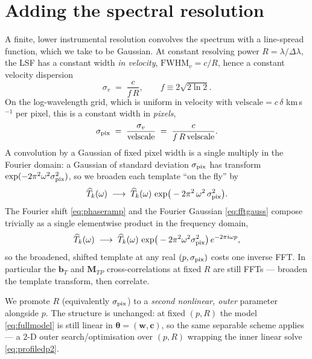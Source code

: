 \documentclass[11pt]{article}
\newcommand{\velscale}{\mathrm{velscale}}
\begin{document}
\section{Adding the spectral resolution}
\label{sec:resolution}
A finite, lower instrumental resolution convolves the spectrum with a
line-spread function, which we take to be Gaussian. At constant resolving power
$R=\lambda/\Delta\lambda$, the LSF has a constant width \emph{in velocity},
$\mathrm{FWHM}_v = c/R$, hence a constant velocity dispersion
\begin{equation}
  \sigma_v \;=\; \frac{c}{f\,R},
  \qquad f \equiv 2\sqrt{2\ln 2}.
\end{equation}
On the log-wavelength grid, which is uniform in velocity with
$\velscale = c\,\delta$ km\,s$^{-1}$ per pixel, this is a constant width in
\emph{pixels},
\begin{equation}
  \sigma_{\rm pix} \;=\; \frac{\sigma_v}{\velscale} \;=\; \frac{c}{f\,R\,\velscale}.
  \label{eq:sigpix}
\end{equation}
A convolution by a Gaussian of fixed pixel width is a single multiply in the
Fourier domain: a Gaussian of standard deviation $\sigma_{\rm pix}$ has transform
$\exp(-2\pi^2\omega^2\sigma_{\rm pix}^2)$, so we broaden each template ``on the
fly'' by
\begin{equation}
  \widehat{T}_k(\omega) \;\longrightarrow\; \widehat{T}_k(\omega)\,
  \exp\!\big(-2\pi^2\,\omega^2\,\sigma_{\rm pix}^2\big).
  \label{eq:fftgauss}
\end{equation}
The Fourier shift \eqref{eq:phaseramp} and the Fourier Gaussian
\eqref{eq:fftgauss} compose trivially as a single elementwise product in the
frequency domain,
\begin{equation}
  \widehat{T}_k(\omega)\;\longrightarrow\;
  \widehat{T}_k(\omega)\,
  \exp\!\big(-2\pi^2\omega^2\sigma_{\rm pix}^2\big)\,
  e^{-2\pi i\omega p},
\end{equation}
so the broadened, shifted template at any real $(p,\sigma_{\rm pix})$ costs one
inverse FFT. In particular the $\mathbf{b}_T$ and $\mathbf{M}_{TP}$
cross-correlations at fixed $R$ are still FFTs --- broaden the template transform,
then correlate.

We promote $R$ (equivalently $\sigma_{\rm pix}$) to a \emph{second nonlinear,
outer} parameter alongside $p$. The structure is unchanged: at fixed
$(p,R)$ the model \eqref{eq:fullmodel} is still linear in
$\boldsymbol\theta=(\mathbf{w},\mathbf{c})$, so the same separable scheme applies
--- a $2$-D outer search/optimisation over $(p,R)$ wrapping the inner linear solve
\eqref{eq:profiledp2}.
\end{document}
